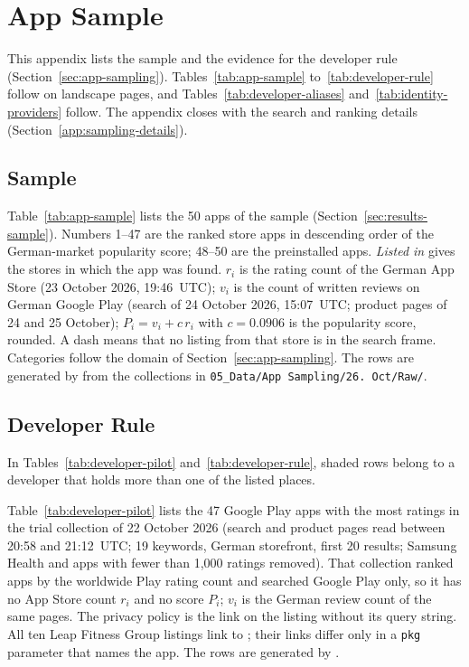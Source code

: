 \chapter{App Sample}
\label{app:app-sample}
This appendix lists the sample and the evidence for the developer rule
(Section~\ref{sec:app-sampling}). Tables~\ref{tab:app-sample}
to~\ref{tab:developer-rule} follow on landscape pages, and
Tables~\ref{tab:developer-aliases} and~\ref{tab:identity-providers} follow. The
appendix closes with the search and ranking details
(Section~\ref{app:sampling-details}).

\section{Sample}
Table~\ref{tab:app-sample} lists the 50 apps of the sample
(Section~\ref{sec:results-sample}). Numbers 1--47 are the ranked store apps in
descending order of the German-market popularity score; 48--50 are the
preinstalled apps. \emph{Listed in} gives the stores in which the app was found.
$r_i$ is the rating count of the German App Store (23 October 2026, 19:46~UTC);
$v_i$ is the count of written reviews on German Google Play (search of 24
October 2026, 15:07~UTC; product pages of 24 and 25 October); $P_i=v_i+c\,r_i$
with $c=0.0906$ is the popularity score, rounded. A dash means that no listing
from that store is in the search frame.
Categories follow the domain of Section~\ref{sec:app-sampling}. The rows are
generated by  from the collections in
\texttt{05\_Data/App~Sampling/26.~Oct/Raw/}.

\section{Developer Rule}
\label{app:developer-rule}
In Tables~\ref{tab:developer-pilot} and~\ref{tab:developer-rule}, shaded rows
belong to a developer that holds more than one of the listed places.

Table~\ref{tab:developer-pilot} lists the 47 Google Play apps with the most
ratings in the trial collection of 22 October 2026 (search and product pages
read between 20:58 and 21:12~UTC; 19 keywords, German storefront, first 20
results; Samsung Health and apps with fewer than 1{,}000 ratings removed). That
collection ranked apps by the worldwide Play rating count and searched Google
Play only, so it has no App Store count $r_i$ and no score $P_i$; $v_i$ is the
German review count of the same pages. The privacy policy is the link on the
listing without its query string. All ten Leap Fitness Group listings link to
; their links differ only in a
\texttt{pkg} parameter that names the app. The rows are generated by
.

